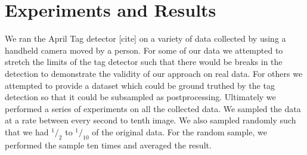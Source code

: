 \documentclass[12pt]{article}
\begin{document}
\section{Experiments and Results}
We ran the April Tag detector [cite] on a variety of data collected by using a handheld camera moved by a person.  For some of our data we attempted to stretch the limits of the tag detector such that there would be breaks in the detection to demonstrate the validity of our approach on real data.  For others we attempted to provide a dataset which could be ground truthed by the tag detection so that it could be subsampled as postprocessing.  Ultimately we performed a series of experiments on all the collected data.  We sampled the data at a rate between every second to tenth image.  We also sampled randomly such that we had $^1/_2$ to $^1/_{10}$ of the original data.  For the random sample, we performed the sample ten times and averaged the result.
\end{document}
